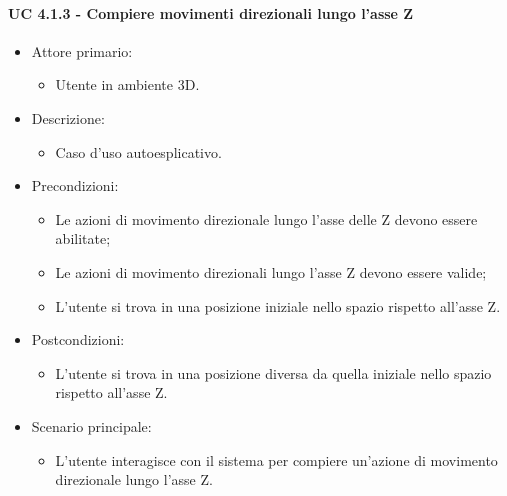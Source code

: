 \paragraph{UC 4.1.3 - Compiere movimenti direzionali lungo l'asse Z}
\begin{itemize}

	\item Attore primario: 
	\begin{itemize}
		\item Utente in ambiente 3D.
	\end{itemize}
	\item Descrizione:
	\begin{itemize}
		\item Caso d'uso autoesplicativo.
	\end{itemize}
	
	\item Precondizioni:
	\begin{itemize}
		\item Le azioni di movimento direzionale lungo l'asse delle Z devono essere abilitate;
		\item Le azioni di movimento direzionali lungo l'asse Z devono essere valide;
		\item L'utente si trova in una posizione iniziale nello spazio rispetto all'asse Z.
	\end{itemize}
	
	\item Postcondizioni:
	\begin{itemize}
		\item L'utente si trova in una posizione diversa da quella iniziale nello spazio rispetto all'asse Z.
	\end{itemize}
	
	\item Scenario principale:
	\begin{itemize}
		\item L'utente interagisce con il sistema per compiere un'azione di movimento direzionale lungo l'asse Z.
	\end{itemize}
	
\end{itemize}

